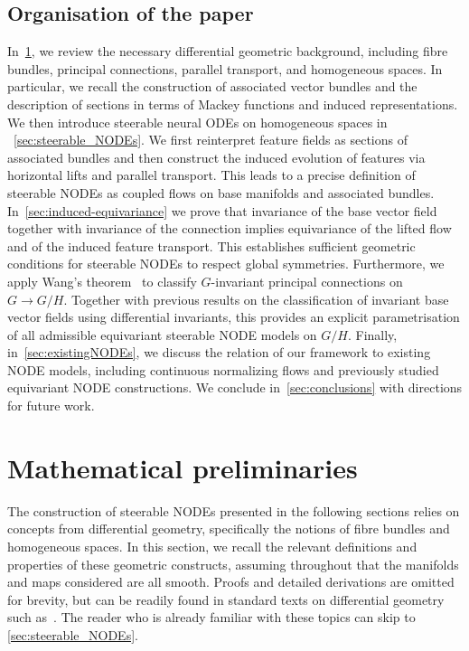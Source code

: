 \documentclass[12pt,a4paper]{article}
\numberwithin{equation}{section}
\theoremstyle{plain}
\theoremstyle{definition}
\theoremstyle{remark}
\begin{document}
\subsection{Organisation of the paper}
\label{sec:intro_organisation}
In~\cref{sec:mathematical_preliminaries}, we review the necessary differential geometric background, including fibre bundles, principal connections, parallel transport, and homogeneous spaces. In particular, we recall the construction of associated vector bundles and the description of sections in terms of Mackey functions and induced representations. We then introduce steerable neural ODEs on homogeneous spaces in ~\cref{sec:steerable_NODEs}. We first reinterpret feature fields as sections of associated bundles and then construct the induced evolution of features via horizontal lifts and parallel transport. This leads to a precise definition of steerable NODEs as coupled flows on base manifolds and associated bundles. In~\cref{sec:induced-equivariance} we prove that invariance of the base vector field together with invariance of the connection implies equivariance of the lifted flow and of the induced feature transport. This establishes sufficient geometric conditions for steerable NODEs to respect global symmetries. Furthermore, we apply Wang’s theorem~\cite{Wang1958} to classify $G$-invariant principal connections on $G \to G/H$. Together with previous results on the classification of invariant base vector fields using differential invariants, this provides an explicit parametrisation of all admissible equivariant steerable NODE models on $G/H$. Finally, in~\cref{sec:existingNODEs}, we discuss the relation of our framework to existing NODE models, including continuous normalizing flows and previously studied equivariant NODE constructions.
We conclude in~\cref{sec:conclusions} with directions for future work.


\section{Mathematical preliminaries}\label{sec:mathematical_preliminaries}
The construction of steerable NODEs presented in the following sections relies on concepts from differential geometry, specifically the notions of fibre bundles and homogeneous spaces. In this section, we recall the relevant definitions and properties of these geometric constructs, assuming throughout that the manifolds and maps considered are all smooth. Proofs and detailed derivations are omitted for brevity, but can be readily found in standard texts on differential geometry such as~\cite{Kobayashi1963,Nakahara2003,Lee2012}. The reader who is already familiar with these topics can skip to \cref{sec:steerable_NODEs}.
\end{document}
